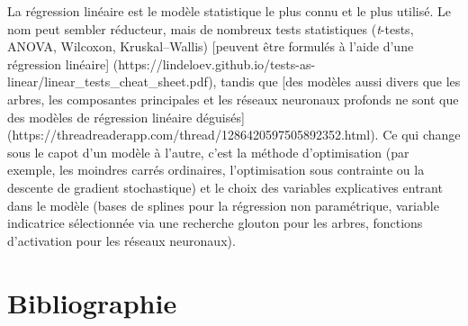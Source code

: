 \documentclass[
  11pt,
  letterpaper,
]{scrbook}
\theoremstyle{plain}
\theoremstyle{plain}
\theoremstyle{definition}
\theoremstyle{definition}
\theoremstyle{remark}
\begin{document}
La régression linéaire est le modèle statistique le plus connu et le
plus utilisé. Le nom peut sembler réducteur, mais de nombreux tests
statistiques (\emph{t}-tests, ANOVA, Wilcoxon, Kruskal--Wallis)
{[}peuvent être formulés à l'aide d'une régression linéaire{]}
(https://lindeloev.github.io/tests-as-linear/linear\_tests\_cheat\_sheet.pdf),
tandis que {[}des modèles aussi divers que les arbres, les composantes
principales et les réseaux neuronaux profonds ne sont que des modèles de
régression linéaire déguisés{]}
(https://threadreaderapp.com/thread/1286420597505892352.html). Ce qui
change sous le capot d'un modèle à l'autre, c'est la méthode
d'optimisation (par exemple, les moindres carrés ordinaires,
l'optimisation sous contrainte ou la descente de gradient stochastique)
et le choix des variables explicatives entrant dans le modèle (bases de
splines pour la régression non paramétrique, variable indicatrice
sélectionnée via une recherche glouton pour les arbres, fonctions
d'activation pour les réseaux neuronaux).


\chapter*{Bibliographie}\label{bibliographie}

\end{document}
